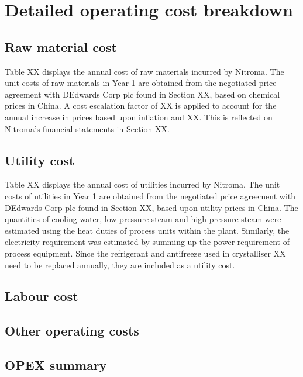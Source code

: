 \section{Detailed operating cost breakdown}
\subsection{Raw material cost}
Table XX displays the annual cost of raw materials incurred by Nitroma. The unit costs of raw materials in Year 1 are obtained from the negotiated price agreement with DEdwards Corp plc found in Section XX, based on chemical prices in China. A cost escalation factor of XX is applied to account for the annual increase in prices based upon inflation and XX. This is reflected on Nitroma’s financial statements in Section XX.

\subsection{Utility cost}
Table XX displays the annual cost of utilities incurred by Nitroma. The unit costs of utilities in Year 1 are obtained from the negotiated price agreement with DEdwards Corp plc found in Section XX, based upon utility prices in China. The quantities of cooling water, low-pressure steam and high-pressure steam were estimated using the heat duties of process units within the plant. Similarly, the electricity requirement was estimated by summing up the power requirement of process equipment. Since the refrigerant and antifreeze used in crystalliser XX need to be replaced annually, they are included as a utility cost. 

\subsection{Labour cost}
\subsection{Other operating costs}
\subsection{OPEX summary}